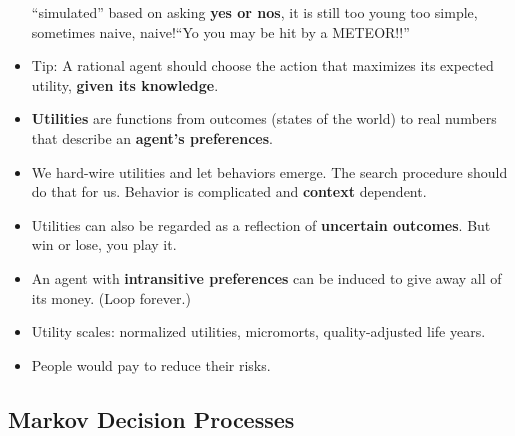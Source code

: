 \documentclass[twocolumn]{article}
\begin{document}
\begin{itemize}
  ``simulated'' based on asking \textbf{yes or nos}, it is still too
  young too simple, sometimes naive, naive!``Yo you may be hit by a
  METEOR!!'' 
\item Tip: A rational agent should choose the action that maximizes
  its expected utility, \textbf{given its knowledge}.
\item \textbf{Utilities} are functions from outcomes (states of the
  world) to real numbers that describe an \textbf{agent's
    preferences}.
\item We hard-wire utilities and let behaviors emerge. The search
  procedure should do that for us. Behavior is complicated and
  \textbf{context} dependent.
\item Utilities can also be regarded as a reflection of
  \textbf{uncertain outcomes}. But win or lose, you play it.
\item An agent with \textbf{intransitive preferences} can be induced
  to give away all of its money. (Loop forever.)
\item Utility scales: normalized utilities, micromorts,
  quality-adjusted life years.
\item People would pay to reduce their risks.
\end{itemize}

\subsection{Markov Decision Processes}
\label{sec:mark-decis-proc}
\end{document}

